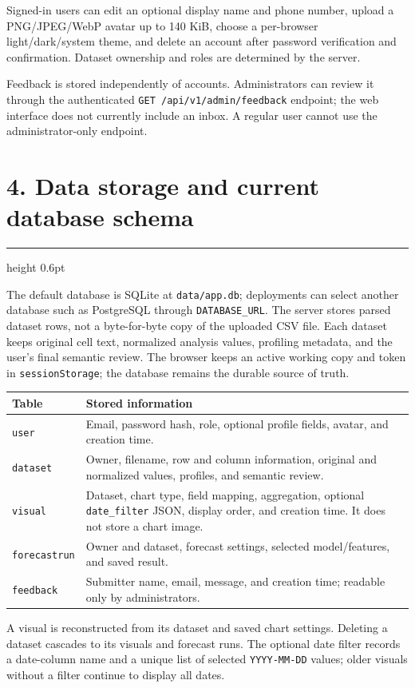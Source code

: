 \documentclass[11pt,a4paper]{article}
\newcommand{\sectiontitle}[1]{%
  \Needspace{5\baselineskip}\vspace{2pt}\section*{\color{brand}#1}\vspace{-5pt}\hrule height 0.6pt\vspace{7pt}
}
\begin{document}
Signed-in users can edit an optional display name and phone number, upload a
PNG/JPEG/WebP avatar up to 140 KiB, choose a per-browser light/dark/system
theme, and delete an account after password verification and confirmation.
Dataset ownership and roles are determined by the server.

Feedback is stored independently of accounts. Administrators can review it
through the authenticated \texttt{GET /api/v1/admin/feedback} endpoint; the
web interface does not currently include an inbox. A regular user cannot use
the administrator-only endpoint.

\sectiontitle{4. Data storage and current database schema}

The default database is SQLite at \texttt{data/app.db}; deployments can select
another database such as PostgreSQL through \texttt{DATABASE\_URL}. The server
stores parsed dataset rows, not a byte-for-byte copy of the uploaded CSV file.
Each dataset keeps original cell text, normalized analysis values, profiling
metadata, and the user's final semantic review. The browser keeps an active
working copy and token in \texttt{sessionStorage}; the database remains the
durable source of truth.

\begin{tabularx}{\linewidth}{@{}lX@{}}
\toprule
\textbf{Table} & \textbf{Stored information}\\
\midrule
\texttt{user} & Email, password hash, role, optional profile fields, avatar, and creation time.\\
\texttt{dataset} & Owner, filename, row and column information, original and normalized values, profiles, and semantic review.\\
\texttt{visual} & Dataset, chart type, field mapping, aggregation, optional \texttt{date\_filter} JSON, display order, and creation time. It does not store a chart image.\\
\texttt{forecastrun} & Owner and dataset, forecast settings, selected model/features, and saved result.\\
\texttt{feedback} & Submitter name, email, message, and creation time; readable only by administrators.\\
\bottomrule
\end{tabularx}

A visual is reconstructed from its dataset and saved chart settings. Deleting a
dataset cascades to its visuals and forecast runs. The optional date filter
records a date-column name and a unique list of selected \texttt{YYYY-MM-DD}
values; older visuals without a filter continue to display all dates.
\end{document}
